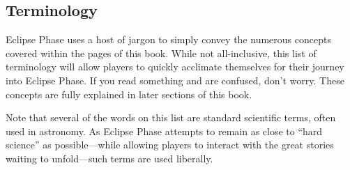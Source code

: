 \subsection{Terminology} \label{sec:terminology} 

Eclipse Phase uses a host of jargon to simply convey the numerous concepts covered within the pages of this book. While not all-inclusive, this list of terminology will allow players to quickly acclimate themselves for their journey into Eclipse Phase. If you read something and are confused, don't worry. These concepts are fully explained in later sections of this book. 

Note that several of the words on this list are standard scientific terms, often used in astronomy. As Eclipse Phase attempts to remain as close to ``hard science'' as possible—while allowing players to interact with the great stories waiting to unfold—such terms are used liberally. 

